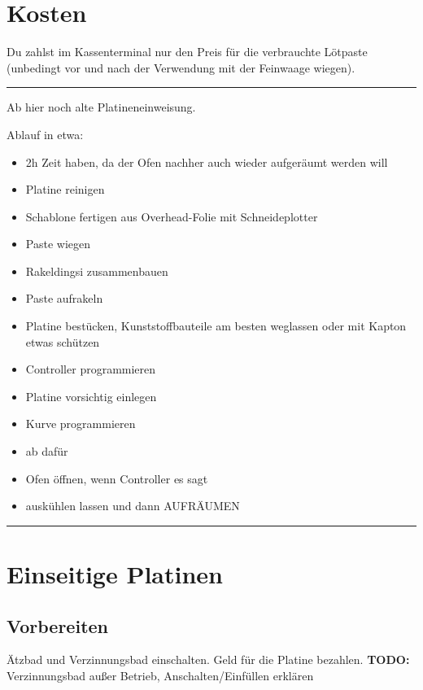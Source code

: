 \documentclass{\basedir/fablab-document}
\begin{document}
\section{Kosten}
Du zahlst im Kassenterminal nur den Preis für die verbrauchte Lötpaste (unbedingt vor und nach der Verwendung mit der Feinwaage wiegen). \\

\color{red}
\hrule
\begin{center}
\large{Ab hier noch alte Platineneinweisung.}
{\color{black}}

Ablauf in etwa:
\begin{itemize}
\item 2h Zeit haben, da der Ofen nachher auch wieder aufgeräumt werden will
\item Platine reinigen
\item Schablone fertigen aus Overhead-Folie mit Schneideplotter
\item Paste wiegen
\item Rakeldingsi zusammenbauen
\item Paste aufrakeln
\item Platine bestücken, Kunststoffbauteile am besten weglassen oder mit Kapton etwas schützen
\item Controller programmieren
\item Platine vorsichtig einlegen
\item Kurve programmieren
\item ab dafür
\item Ofen öffnen, wenn Controller es sagt
\item auskühlen lassen und dann AUFRÄUMEN
\end{itemize}
\vspace{0.1cm}
\end{center}
\hrule
\color{black}

\section{Einseitige Platinen}
\secttoc

\subsection{Vorbereiten}
\label{sec:vorbereiten}
Ätzbad und Verzinnungsbad einschalten. Geld für die Platine bezahlen. \textbf{TODO: } Verzinnungsbad außer Betrieb, Anschalten/Einfüllen erklären
\end{document}
